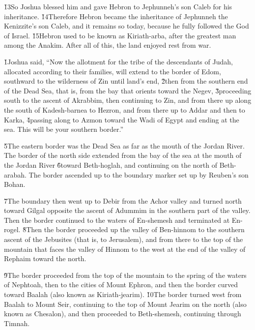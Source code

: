 \v{13}So Joshua blessed him and gave Hebron to Jephunneh's son Caleb for his inheritance. \v{14}Therefore Hebron became the inheritance of Jephunneh the Kenizzite's son Caleb, and it remains so today, because he fully followed the  God of Israel. \v{15}Hebron used to be known as Kiriath-arba, after the greatest man among the Anakim. After all of this, the land enjoyed rest from war.

\v{1}Joshua said, ``Now the allotment for the tribe of the descendants of Judah, allocated according to their families, will extend to the border of Edom, southward to the wilderness of Zin until land's end, \v{2}then from the southern end of the Dead Sea, that is, from the bay that orients toward the Negev, \v{3}proceeding south to the ascent of Akrabbim, then continuing to Zin, and from there up along the south of Kadesh-barnea to Hezron, and from there up to Addar and then to Karka, \v{4}passing along to Azmon toward the Wadi of Egypt and ending at the sea. This will be your southern border.''

\v{5}The eastern border was the Dead Sea as far as the mouth of the Jordan River. The border of the north side extended from the bay of the sea at the mouth of the Jordan River \v{6}toward Beth-hoglah, and continuing on the north of Beth-arabah. The border ascended up to the boundary marker set up by Reuben's son Bohan.

\v{7}The boundary then went up to Debir from the Achor valley and turned north toward Gilgal opposite the ascent of Adummim in the southern part of the valley. Then the border continued to the waters of En-shemesh and terminated at En-rogel. \v{8}Then the border proceeded up the valley of Ben-hinnom to the southern ascent of the Jebusites (that is, to Jerusalem), and from there to the top of the mountain that faces the valley of Hinnom to the west at the end of the valley of Rephaim toward the north.

\v{9}The border proceeded from the top of the mountain to the spring of the waters of Nephtoah, then to the cities of Mount Ephron, and then the border curved toward Baalah (also known as Kiriath-jearim). \v{10}The border turned west from Baalah to Mount Seir, continuing to the top of Mount Jearim on the north (also known as Chesalon), and then proceeded to Beth-shemesh, continuing through Timnah.

